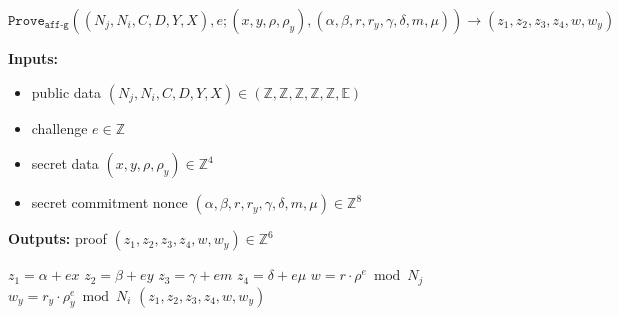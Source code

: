 \documentclass[11pt]{article}
\newenvironment{inlineAlgorithm}{}{}
\newcommand{\algoName}[1]{#1 \par}
\newcommand{\algoInputsList}[1]{
    {\small \bf Inputs:} 
        \begin{itemize}[noitemsep,topsep=0pt]
            #1
        \end{itemize}
}
\newcommand{\algoOutputs}[1]{
    {\small \bf Outputs:} #1 \par
}
\newcommand{\prove}[1]{\ensuremath{\mathtt{Prove}_{\mathtt{#1}}}}
\newcommand{\E}{\mathbb{E}}
\newcommand{\Z}{\mathbb{Z}}
\newcommand{\?}[1]{\stackrel{?}{#1}}
\begin{document}
\begin{description}
\item
\begin{inlineAlgorithm}
\algoName{$\prove{aff\mbox{-}g}(
    (N_j, N_i, C, D, Y, X),
    e;
    (x, y, \rho, \rho_y),
    (\alpha, \beta, r, r_y, \gamma, \delta, m, \mu)
) \to (z_1, z_2, z_3, z_4, w, w_y)$}
\algoInputsList{
    \item public data $(N_j, N_i, C, D, Y, X) \in (\Z, \Z, \Z, \Z, \Z, \E)$
    \item challenge $e \in \Z$
    \item secret data $(x, y, \rho, \rho_y) \in \Z^4$
    \item secret commitment nonce $(\alpha, \beta, r, r_y, \gamma, \delta, m, \mu) \in \Z^8$
}
\algoOutputs{proof $(z_1, z_2, z_3, z_4, w, w_y) \in \Z^6$}
\begin{algorithmic}[1]
\State $z_1 = \alpha + e x$
\State $z_2 = \beta + e y$
\State $z_3 = \gamma + e m$
\State $z_4 = \delta + e \mu$
\State $w = r \cdot \rho^e \bmod N_j$
\State $w_y = r_y \cdot \rho_y^e \bmod N_i$
\State \Return $(z_1, z_2, z_3, z_4, w, w_y)$
\end{algorithmic}
\end{inlineAlgorithm}


\end{description}
\end{document}
